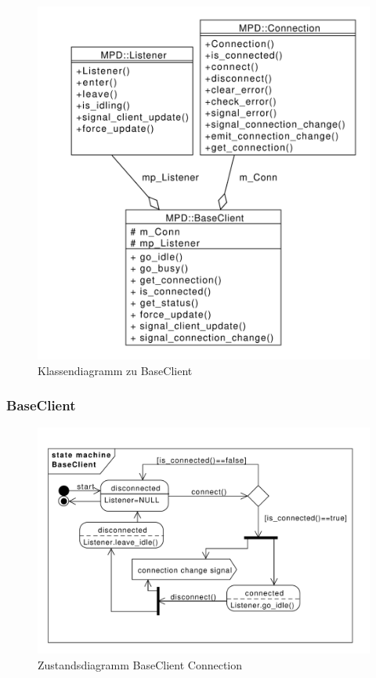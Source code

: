 \begin{figure}[htb!]
	\centering
        \includegraphics[scale=0.55]{BaseClientCollab.pdf}
	\caption{Klassendiagramm zu BaseClient}
	\label{collab_base_client}
\end{figure}

\newpage
\subsubsection{BaseClient}

\begin{figure}[htb!]
	\centering
        \includegraphics[width=\textwidth]{st_BaseClientConnection.pdf}
	\caption{Zustandsdiagramm BaseClient Connection}
	\label{st_base_client}
\end{figure}

